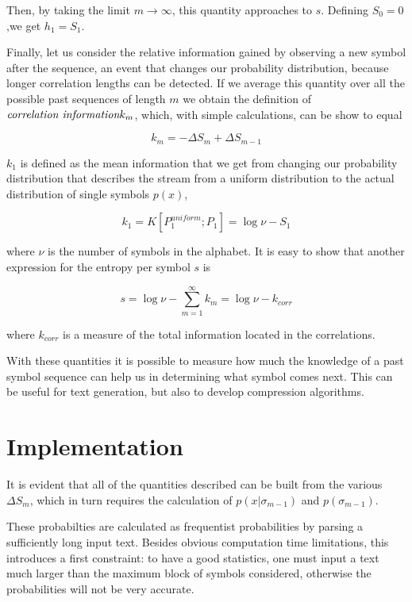 \documentclass[11pt]{article} %
\begin{document}
Then, by taking the limit $m\rightarrow\infty$, this quantity approaches to $s$. Defining $S_0 = 0$,we get $h_1 = S_1$.

Finally, let us consider the relative information gained by observing a new symbol after the sequence, an event that changes our probability distribution, because longer correlation lengths can be detected. If we average this quantity over all the possible past sequences of length $m$ we obtain the definition of $\emph{correlation information} k_m$, which, with simple calculations, can be show to equal

\begin{dmath}
k_m = -\Delta S_m + \Delta S_{m-1}
\end{dmath}

$k_1$ is defined as the mean information that we get from changing our probability distribution that describes the stream from a uniform distribution to the actual distribution of single symbols $p(x)$,

\begin{dmath}
k_1 = K[P_1^{uniform}; P_1] = \log \nu - S_1
\end{dmath}

where $\nu$ is the number of symbols in the alphabet. It is easy to show that another expression for the entropy per symbol $s$ is

\begin{dmath}
s = \log \nu - \sum_{m=1}^\infty k_m = \log \nu - k_{corr}
\end{dmath}

where $k_{corr}$ is a measure of the total information located in the correlations.

With these quantities it is possible to measure how much the knowledge of a past symbol sequence can help us in determining what symbol comes next. This can be useful for text generation, but also to develop compression algorithms.

\section{Implementation}

It is evident that all of the quantities described can be built from the various $\Delta S_m$, which in turn requires the calculation of $p(x|\sigma_{m-1})$ and $p(\sigma_{m-1})$.

These probabilties are calculated as frequentist probabilities by parsing a sufficiently long input text. Besides obvious computation time limitations, this introduces a first constraint: to have a good statistics, one must input a text much larger than the maximum block of symbols considered, otherwise the probabilities will not be very accurate.
\end{document}
